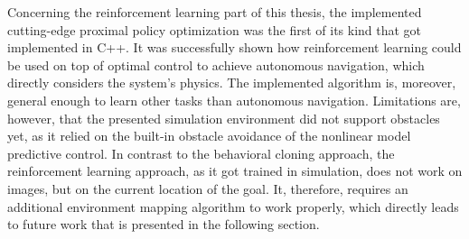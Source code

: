 Concerning the reinforcement learning part of this thesis, the implemented cutting-edge proximal policy optimization was the first of its kind that got implemented in C++. It was successfully shown how reinforcement learning could be used on top of optimal control to achieve autonomous navigation, which directly considers the system's physics. The implemented algorithm is, moreover, general enough to learn other tasks than autonomous navigation. Limitations are, however, that the presented simulation environment did not support obstacles yet, as it relied on the built-in obstacle avoidance of the nonlinear model predictive control. In contrast to the behavioral cloning approach, the reinforcement learning approach, as it got trained in simulation, does not work on images, but on the current location of the goal. It, therefore, requires an additional environment mapping algorithm to work properly, which directly leads to future work that is presented in the following section.
\FloatBarrier
